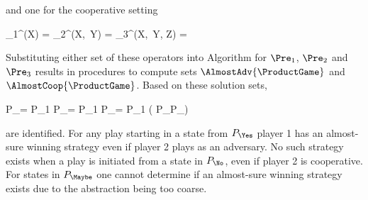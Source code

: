     and one for the cooperative setting

    \startformula
        \startalign[n=2,align={right,left}]
            \NC \Pre_1^{\Cooperative}(X) =
            \NC {} \EndComma
            \NR
            \NC \Pre_2^{\Cooperative}(X,\, Y) =
            \NC {} \EndComma
            \NR
            \NC \Pre_3^{\Cooperative}(X,\, Y, Z) =
            \NC {} \EndPeriod
            \NR
        \stopalign
    \stopformula


    Substituting either set of these operators into Algorithm  for $\Pre_1$, $\Pre_2$ and $\Pre_3$ results in procedures to compute sets $\AlmostAdv{\ProductGame}$ and $\AlmostCoop{\ProductGame}$.
    Based on these solution sets,

    \startformula
        \startalign[n=2,align={right,left}]
            \NC P_\Yes =
            \NC P_1 \cap \AlmostAdv{\ProductGame} \EndComma
            \NR
            \NC P_\No =
            \NC P_1 \setminus \AlmostCoop{\ProductGame} \EndAnd
            \NR
            \NC P_\Maybe =
            \NC P_1 \setminus ( P_\Yes \cup P_\No )
            \NR
        \stopalign
    \stopformula

    are identified.
    For any play starting in a state from $P_\Yes$ player 1 has an almost-sure winning strategy even if player 2 plays as an adversary.
    No such strategy exists when a play is initiated from a state in $P_\No$, even if player 2 is cooperative.
    For states in $P_\Maybe$ one cannot determine if an almost-sure winning strategy exists due to the abstraction being too coarse.

